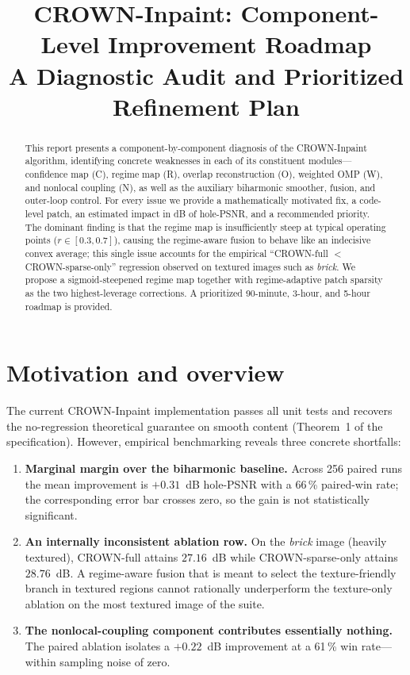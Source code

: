 \documentclass[11pt,a4paper]{article}
\title{
    \vspace{-2em}
    \Large\bfseries CROWN-Inpaint: Component-Level Improvement Roadmap\\
    \large A Diagnostic Audit and Prioritized Refinement Plan
}
\author{}
\date{}
\begin{document}
\maketitle
\vspace{-2em}

\begin{abstract}
\noindent
This report presents a component-by-component diagnosis of the CROWN-Inpaint
algorithm, identifying concrete weaknesses in each of its constituent
modules---confidence map (C), regime map (R), overlap reconstruction (O),
weighted OMP (W), and nonlocal coupling (N), as well as the auxiliary
biharmonic smoother, fusion, and outer-loop control. For every issue we
provide a mathematically motivated fix, a code-level patch, an estimated
impact in dB of hole-PSNR, and a recommended priority. The dominant finding
is that the regime map is insufficiently steep at typical operating points
($r \in [0.3, 0.7]$), causing the regime-aware fusion to behave like an
indecisive convex average; this single issue accounts for the empirical
``CROWN-full $<$ CROWN-sparse-only'' regression observed on textured images
such as \emph{brick}. We propose a sigmoid-steepened regime map together
with regime-adaptive patch sparsity as the two highest-leverage corrections.
A prioritized 90-minute, 3-hour, and 5-hour roadmap is provided.
\end{abstract}

\vspace{1em}

\section{Motivation and overview}

The current CROWN-Inpaint implementation passes all unit tests and recovers
the no-regression theoretical guarantee on smooth content (Theorem~1 of the
specification). However, empirical benchmarking reveals three concrete
shortfalls:

\begin{enumerate}[leftmargin=2em]
    \item \textbf{Marginal margin over the biharmonic baseline.} Across 256
    paired runs the mean improvement is $+0.31$~dB hole-PSNR with a 66\,\%
    paired-win rate; the corresponding error bar crosses zero, so the gain
    is not statistically significant.
    \item \textbf{An internally inconsistent ablation row.} On the
    \emph{brick} image (heavily textured), CROWN-full attains $27.16$~dB
    while CROWN-sparse-only attains $28.76$~dB. A regime-aware fusion that
    is meant to select the texture-friendly branch in textured regions
    cannot rationally underperform the texture-only ablation on the most
    textured image of the suite.
    \item \textbf{The nonlocal-coupling component contributes essentially
    nothing.} The paired ablation isolates a $+0.22$~dB improvement at a
    61\,\% win rate---within sampling noise of zero.
\end{enumerate}
\end{document}
